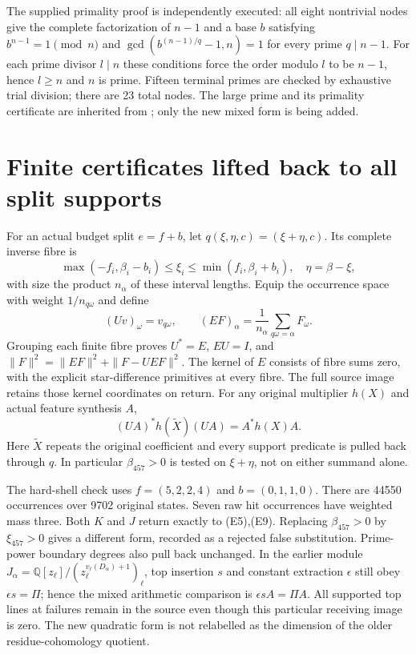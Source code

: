 The supplied primality proof is independently executed: all eight nontrivial
nodes give the complete factorization of $n-1$ and a base $b$ satisfying
$b^{n-1}=1\pmod n$ and
$\gcd(b^{(n-1)/q}-1,n)=1$ for every prime $q\mid n-1$.
For each prime divisor $l\mid n$ these conditions force the order modulo $l$
to be $n-1$, hence $l\ge n$ and $n$ is prime. Fifteen terminal primes are
checked by exhaustive trial division; there are 23 total nodes.
The large prime and its primality certificate are inherited from \cite{Prior};
only the new mixed form is being added.

\section{Finite certificates lifted back to all split supports}
For an actual budget split $e=f+b$, let $q(\xi,\eta,c)=(\xi+\eta,c)$.
Its complete inverse fibre is
\[
 \max(-f_i,\beta_i-b_i)\le\xi_i\le\min(f_i,\beta_i+b_i),\quad
 \eta=\beta-\xi,
\]
with size the product $n_\alpha$ of these interval lengths.
Equip the occurrence space with weight $1/n_{q\omega}$ and define
\[
 (Uv)_\omega=v_{q\omega},\qquad
 (EF)_\alpha=\frac1{n_\alpha}\sum_{q\omega=\alpha}F_\omega.
\]
Grouping each finite fibre proves $U^*=E$, $EU=I$, and
$\|F\|^2=\|EF\|^2+\|F-UEF\|^2$. The kernel of $E$ consists of fibre sums
zero, with the explicit star-difference primitives at every fibre.
The full source image retains those kernel coordinates on return.
For any original multiplier $h(X)$ and actual feature synthesis $A$,
\[
 \boxed{(UA)^*h(\widetilde X)(UA)=A^*h(X)A.}\tag{W1}
\]
Here $\widetilde X$ repeats the original coefficient and every support
predicate is pulled back through $q$. In particular $\beta_{457}>0$ is tested
on $\xi+\eta$, not on either summand alone.

The hard-shell check uses $f=(5,2,2,4)$ and $b=(0,1,1,0)$.
There are 44550 occurrences over 9702 original states. Seven raw hit
occurrences have weighted mass three. Both $K$ and $J$ return exactly to
(E5),(E9). Replacing $\beta_{457}>0$ by $\xi_{457}>0$ gives a different form,
recorded as a rejected false substitution.
Prime-power boundary degrees also pull back unchanged. In the earlier module
$J_\alpha=\mathbb Q[z_\ell]/(z_\ell^{v_\ell(D_\alpha)+1})_\ell$,
top insertion $s$ and constant extraction $\epsilon$ still obey
$\epsilon s=\Pi$; hence the mixed arithmetic comparison is $\epsilon s A=\Pi A$.
All supported top lines at failures remain in the source even though this
particular receiving image is zero. The new quadratic form is not relabelled
as the dimension of the older residue-cohomology quotient.

